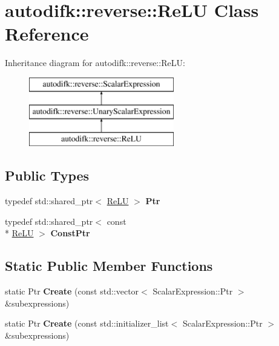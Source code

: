 \hypertarget{classautodifk_1_1reverse_1_1_re_l_u}{\section{autodifk\-:\-:reverse\-:\-:Re\-L\-U Class Reference}
\label{classautodifk_1_1reverse_1_1_re_l_u}
}
Inheritance diagram for autodifk\-:\-:reverse\-:\-:Re\-L\-U\-:\begin{figure}[H]
\begin{center}
\leavevmode
\includegraphics[height=3.000000cm]{classautodifk_1_1reverse_1_1_re_l_u}
\end{center}
\end{figure}
\subsection*{Public Types}
\begin{DoxyCompactItemize}
\item 
\hypertarget{classautodifk_1_1reverse_1_1_re_l_u_a10f0c79f8521e7a77039b6eb6c89411d}{typedef std\-::shared\-\_\-ptr$<$ \hyperlink{classautodifk_1_1reverse_1_1_re_l_u}{Re\-L\-U} $>$ {\bfseries Ptr}}\label{classautodifk_1_1reverse_1_1_re_l_u_a10f0c79f8521e7a77039b6eb6c89411d}

\item 
\hypertarget{classautodifk_1_1reverse_1_1_re_l_u_a58cc1f35f8846f33c62a99e3ada64ab8}{typedef std\-::shared\-\_\-ptr$<$ const \\*
\hyperlink{classautodifk_1_1reverse_1_1_re_l_u}{Re\-L\-U} $>$ {\bfseries Const\-Ptr}}\label{classautodifk_1_1reverse_1_1_re_l_u_a58cc1f35f8846f33c62a99e3ada64ab8}

\end{DoxyCompactItemize}
\subsection*{Static Public Member Functions}
\begin{DoxyCompactItemize}
\item 
\hypertarget{classautodifk_1_1reverse_1_1_re_l_u_ab16e471d11d7d1176661b2304ce5a1fd}{static Ptr {\bfseries Create} (const std\-::vector$<$ Scalar\-Expression\-::\-Ptr $>$ \&subexpressions)}\label{classautodifk_1_1reverse_1_1_re_l_u_ab16e471d11d7d1176661b2304ce5a1fd}

\item 
\hypertarget{classautodifk_1_1reverse_1_1_re_l_u_a7829600acddc4450b67212f94f74f487}{static Ptr {\bfseries Create} (const std\-::initializer\-\_\-list$<$ Scalar\-Expression\-::\-Ptr $>$ \&subexpressions)}\label{classautodifk_1_1reverse_1_1_re_l_u_a7829600acddc4450b67212f94f74f487}

\end{DoxyCompactItemize}
